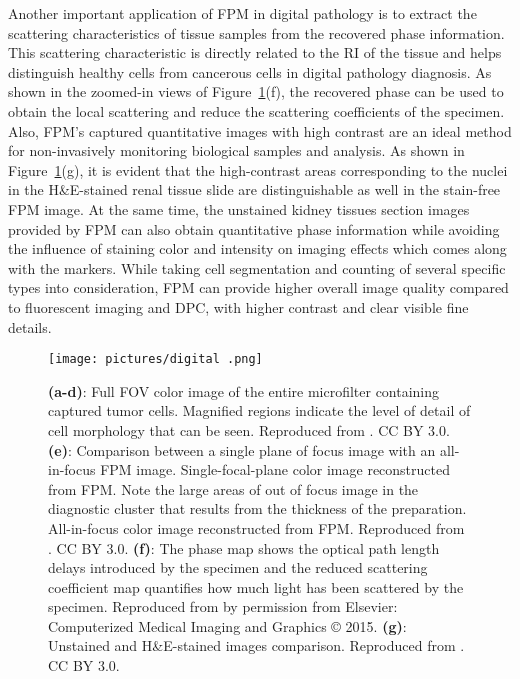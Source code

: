 \documentclass[journal,review,submit,pdftex,moreauthors]{Definitions/mdpi}
\begin{document}
Another important application of FPM in digital pathology is to extract the scattering characteristics of tissue samples from the recovered phase information. This scattering characteristic is directly related to the RI of the tissue and helps distinguish healthy cells from cancerous cells in digital pathology diagnosis\cite{horstmeyer2015digital}. As shown in the zoomed-in views of Figure~\ref{pathodoly}(f), the recovered phase can be used to obtain the local scattering and reduce the scattering coefficients of the specimen. Also, FPM's captured quantitative images with high contrast are an ideal method for non-invasively monitoring biological samples and analysis. As shown in Figure~\ref{pathodoly}(g), it is evident that the high-contrast areas corresponding to the nuclei in the H&E-stained renal tissue slide are distinguishable as well in the stain-free FPM image\cite{valentino2023beyond}. At the same time, the unstained kidney tissues section images provided by FPM can also obtain quantitative phase information while avoiding the influence of staining color and intensity on imaging effects which comes along with the markers. While taking cell segmentation and counting of several specific types into consideration, FPM can provide higher overall image quality compared to fluorescent imaging and DPC, with higher contrast and clear visible fine details\cite{wakefield2022cellular}.


\begin{figure}[H]
\texttt{[image: pictures/digital .png]}
\caption{\textbf{(a-d)}: Full FOV color image of the entire microfilter containing captured tumor cells. Magnified regions indicate the level of detail of cell morphology that can be seen. Reproduced from \cite{williams2014fourier}. CC BY 3.0. \textbf{(e)}: Comparison between a single plane of focus image with an all-in-focus FPM image. Single-focal-plane color image reconstructed from FPM. Note the large areas of out of focus image in the diagnostic cluster that results from the thickness of the preparation. All-in-focus color image reconstructed from FPM. Reproduced from \cite{liang2022all}. CC BY 3.0. \textbf{(f)}: The phase map shows the optical path length delays introduced by the specimen and the reduced scattering coefficient map quantifies how much light has been scattered by the specimen. Reproduced from \cite{horstmeyer2015digital} by permission from Elsevier: Computerized Medical Imaging and Graphics © 2015. \textbf{(g)}: Unstained and H&E-stained images comparison. Reproduced from \cite{valentino2023beyond}. CC BY 3.0. \label{pathodoly}}
\end{figure}  
\end{document}
